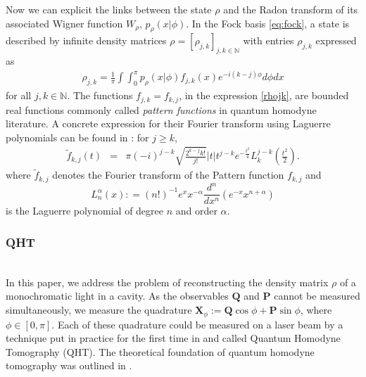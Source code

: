 \documentclass[a4paper]{amsart}
\newcommand{\deq}{\mathrel{\mathop:} = } %
\newcommand{\N}{\mathbb{N}}
\begin{document}
Now we can explicit the links between the state $\rho$ and  the Radon transform
of its associated Wigner function $W_{\rho}$, $p_\rho(x|\phi)$.  In the Fock
basis \eqref{eq:fock}, a state is described  by infinite density matrices
$\rho=[\rho_{j,k}]_{j,k\in\N}$ with entries $\rho_{j,k}$  expressed  as  
       \begin{eqnarray}
       \label{rhojk}
       \rho_{j,k}=\frac 1\pi\int \int_0^\pi
p_\rho(x|\phi)f_{j,k}(x)e^{-i(k-j)\phi}d\phi dx
       \end{eqnarray}
for all $j,k \in\N$.  The functions $f_{j,k} = f_{k,j}$, in the expression
\eqref{rhojk}, are bounded real functions commonly called \textit{pattern
functions} in quantum homodyne literature. A concrete expression for their
Fourier transform using Laguerre polynomials can be found in \cite{Richter1}:
for $j \geq k$,
        \begin{eqnarray}
         \label{Rpattern}
         \tilde{f}_{k,j}(t)  &=&\pi(-i)^{j-k}\sqrt{\frac{2^{k-j} k!}{j!}}|t|
          t^{j-k}e^{-\frac{t^2}{4}}L^{j-k}_k(\frac{t^2}{2}).
         \end{eqnarray}
where $\tilde{f}_{k,j}$ denotes the Fourier transform of the Pattern function
$f_{k,j}$ and 
$$L_{n}^{\alpha}(x) \deq (n!)^{-1} e^x x^{-\alpha} \frac{d^n}{dx^n}
(e^{-x} x^{n+\alpha})$$
 is the Laguerre polynomial of degree $n$ and
order $\alpha$. 




\subsubsection{QHT}
\label{QHT}
\noindent\\


 In this paper, we address the problem of reconstructing the density matrix
$\rho$  of a monochromatic light in a cavity.  As the observables $\mathbf{Q}$
and $\mathbf{P}$ cannot  be measured simultaneously,  we measure the quadrature 
$\mathbf{X}_\phi :=\mathbf{Q}\cos \phi +\mathbf{P}\sin \phi$, where
$\phi\in[0,\pi]$. Each of these quadrature could be measured on a laser beam by
a technique put in practice for the first time in \cite{Smithey} and called
Quantum Homodyne Tomography (QHT). The theoretical foundation of quantum
homodyne tomography was outlined in \cite{Vogel&Risken}.
\end{document}
